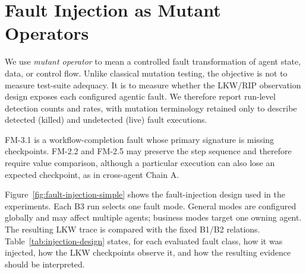 \documentclass[sigconf,review,anonymous,balance=false]{acmart}
\begin{document}
\section{Fault Injection as Mutant Operators}
\label{sec:fault-operators}

We use \emph{mutant operator} to mean a controlled fault transformation of
agent state, data, or control flow. Unlike classical mutation testing, the
objective is not to measure test-suite adequacy. It is to measure whether the
LKW/RIP observation design exposes each configured agentic fault. We therefore
report run-level detection counts and rates, with mutation terminology retained
only to describe detected (killed) and undetected (live) fault executions.

FM-3.1 is a workflow-completion fault whose primary signature is missing
checkpoints. FM-2.2 and FM-2.5 may preserve the step sequence and therefore
require value comparison, although a particular execution can also lose an
expected checkpoint, as in cross-agent Chain A.

Figure~\ref{fig:fault-injection-simple} shows the fault-injection design used
in the experiments. Each B3 run selects one fault mode. General modes are
configured globally and may affect multiple agents; business modes target one
owning agent. The resulting LKW trace is compared with the fixed B1/B2
relations. Table~\ref{tab:injection-design} states, for each evaluated fault
class, how it was injected, how the LKW checkpoints observe it, and how the
resulting evidence should be interpreted.
\end{document}
